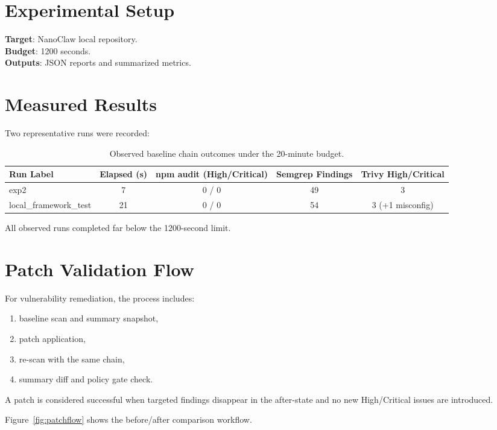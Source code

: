 \documentclass[11pt,a4paper]{article}
\begin{document}
\section{Experimental Setup}
\textbf{Target}: NanoClaw local repository.\\
\textbf{Budget}: 1200 seconds.\\
\textbf{Outputs}: JSON reports and summarized metrics.

\section{Measured Results}
Two representative runs were recorded:

\begin{table}[h]
\centering
\begin{tabular}{lcccc}
\toprule
Run Label & Elapsed (s) & npm audit (High/Critical) & Semgrep Findings & Trivy High/Critical \\
\midrule
exp2 & 7 & 0 / 0 & 49 & 3 \\
local\_framework\_test & 21 & 0 / 0 & 54 & 3 (+1 misconfig) \\
\bottomrule
\end{tabular}
\caption{Observed baseline chain outcomes under the 20-minute budget.}
\end{table}

All observed runs completed far below the 1200-second limit.

\section{Patch Validation Flow}
For vulnerability remediation, the process includes:
\begin{enumerate}[leftmargin=1.5em]
  \item baseline scan and summary snapshot,
  \item patch application,
  \item re-scan with the same chain,
  \item summary diff and policy gate check.
\end{enumerate}

A patch is considered successful when targeted findings disappear in the after-state and no new High/Critical issues are introduced.

Figure~\ref{fig:patchflow} shows the before/after comparison workflow.
\end{document}
